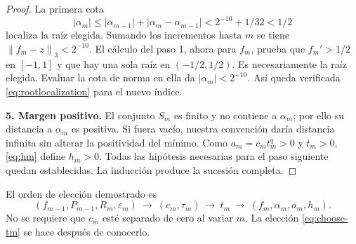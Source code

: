 \documentclass[11pt,a4paper]{article}
\numberwithin{equation}{section}
\theoremstyle{definition}
\theoremstyle{remark}
\newcommand{\norm}[1]{\left\lVert#1\right\rVert}
\newcommand{\paso}[1]{\par\smallskip\noindent\textbf{#1}\quad}
\begin{document}
\begin{proof}
La primera cota
\[
|\alpha_m|\le|\alpha_{m-1}|+|\alpha_m-\alpha_{m-1}|
<2^{-10}+1/32<1/2
\]
localiza la raíz elegida. Sumando los incrementos hasta $m$ se tiene $\norm{f_m-z}_3<2^{-10}$. El cálculo del paso 1, ahora para $f_m$, prueba que $f_m'>1/2$ en $[-1,1]$ y que hay una sola raíz en $(-1/2,1/2)$. Es necesariamente la raíz elegida. Evaluar la cota de norma en ella da $|\alpha_m|<2^{-10}$. Así queda verificada \eqref{eq:rootlocalization} para el nuevo índice.

\paso{5. Margen positivo.}
El conjunto $S_m$ es finito y no contiene a $\alpha_m$; por ello su distancia a $\alpha_m$ es positiva. Si fuera vacío, nuestra convención daría distancia infinita sin alterar la positividad del mínimo. Como $a_m=c_mt_m^q>0$ y $t_m>0$, \eqref{eq:hm} define $h_m>0$. Todas las hipótesis necesarias para el paso siguiente quedan establecidas. La inducción produce la sucesión completa.
\end{proof}

El orden de elección demostrado es
\[
(f_{m-1},P_{m-1},R_m,\varepsilon_m)
\ \longrightarrow\ (c_m,\tau_m)
\ \longrightarrow\ t_m
\ \longrightarrow\ (f_m,\alpha_m,a_m,h_m).
\]
No se requiere que $c_m$ esté separado de cero al variar $m$. La elección \eqref{eq:choose-tm} se hace después de conocerlo.
\end{document}
